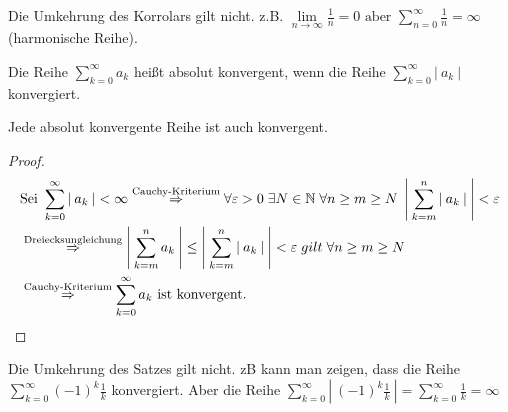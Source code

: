 \documentclass[a4paper,titlepage,oneside]{article}
\def\N{\ensuremath{\mathbb{N}} }
\renewcommand{\epsilon}{\ensuremath{\varepsilon} }
\def\sp{\hspace{0,1cm}}
\newcommand{\suminf}[2][n]{\ensuremath{\sum_{#1= 0}^{\infty}{#2}}}
\renewcommand{\liminf}[2][n]{\ensuremath{\lim\limits_{#1 \rightarrow \infty}{#2}}}
\newcommand{\abs}[1]{\ensuremath{\left|\:#1\:\right|}}
\theoremstyle{thmstyle}
\begin{document}
\begin{subbem}
Die Umkehrung des Korrolars gilt nicht. z.B. \(\liminf{\frac{1}{n}} = 0 \text{ aber } \suminf{\frac{1}{n}} = \infty \) (harmonische Reihe).
\end{subbem}

\begin{subdefi}
Die Reihe \suminf[k]{a_k} heißt absolut konvergent, wenn die Reihe \suminf[k]{\abs{a_k}} konvergiert.
\end{subdefi}

\begin{subsatz}
Jede absolut konvergente Reihe ist auch konvergent.
\begin{proof}
\[\begin{aligned}[t]
&\text{Sei }\suminf[k]{\abs{a_k}} < \infty  \overset{\text{Cauchy-Kriterium}}{\Rightarrow} \forall \epsilon > 0 \sp \exists N \in \N \sp \forall n \ge m \ge N \sp \abs{\sum_{k=m}^{n}{\abs{a_k}}} < \epsilon \\
&\overset{\text{Dreiecksungleichung}}{\Rightarrow} \abs{\sum_{k=m}^{n}{a_k}} \le \abs{\sum_{k=m}^{n}{\abs{a_k}}} < \epsilon \sp gilt \sp \forall n \ge m \ge N \\
&\overset{\text{Cauchy-Kriterium}}{\Rightarrow} \suminf[k]{a_k}\text{ ist konvergent.}
\end{aligned}\]
\end{proof}
\end{subsatz}

\begin{subbem}
Die Umkehrung des Satzes gilt nicht. zB kann man zeigen, dass die Reihe \(\suminf[k]{(-1)^k\frac{1}{k}}\) konvergiert. Aber die Reihe \(\suminf[k]{\abs{(-1)^k\frac{1}{k}}} = \suminf[k]{\frac{1}{k}} = \infty\)
\end{subbem}
\end{document}
